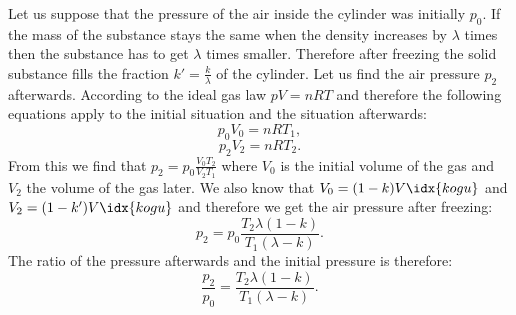 \documentclass[11pt]{article}
\begin{document}
\solueng
Let us suppose that the pressure of the air inside the cylinder was initially $p_{0}$. If the mass of the substance stays the same when the density increases by $\lambda$ times then the substance has to get $\lambda$ times smaller. Therefore after freezing the solid substance fills the fraction $k'=\frac{k}{\lambda}$ of the cylinder. Let us find the air pressure $p_{2}$ afterwards. According to the ideal gas law $pV=nRT$ and therefore the following equations apply to the initial situation and the situation afterwards:
\begin{equation*}
p_{0}V_{0}=nRT_{1},
\end{equation*} 
\begin{equation*}
p_{2}V_{2}=nRT_{2}.
\end{equation*}
From this we find that $p_{2}=p_{0}\frac{V_{0}T_{2}}{V_{2}T_{1}}$ where $V_{0}$ is the initial volume of the gas and $V_{2}$ the volume of the gas later. We also know that $V_{0}=(1-k)V\idx{kogu}$ and $V_{2}=(1-k')V\idx{kogu}$ and therefore we get the air pressure after freezing:
\begin{equation*}
p_{2}=p_{0}\frac{T_{2}\lambda (1-k)}{T_{1}(\lambda-k)}.
\end{equation*} 
The ratio of the pressure afterwards and the initial pressure is therefore:
\begin{equation*}
\frac{p_{2}}{p_{0}}=\frac{T_{2}\lambda(1-k)}{T_{1}(\lambda-k)}.
\end{equation*}
\probend
\bigskip



\bigskip

\end{document}
